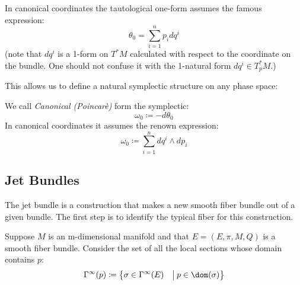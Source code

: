 \documentclass[Main]{subfiles}
\begin{document}
						In canonical coordinates the tautological one-form assumes the famous expression:
						\begin{displaymath}
							\theta_0 = \sum_{i=1}^n {p_i} d q^i
						\end{displaymath}
						(note that $d q^i$ is a 1-form on $T^*M$ calculated with respect to the coordinate on the bundle. One should not confuse it with the 1-natural form $d q^i \in T^*_p M$.)

	
					This allows us to define a natural symplectic structure on any phase space:
					\begin{definition}\label{Def:NatSymForm}
						We call \emph{Canonical (Poincarè)} form the symplectic:
						\begin{displaymath}
							\omega_0 \coloneqq -d \theta_0
						\end{displaymath}
						In canonical coordinates it assumes the renown expression:
						\begin{displaymath}
							\omega_0 \coloneqq \sum_{i=1}^n  d q^i \wedge d p_i
						\end{displaymath}
					\end{definition}
					
		\subsection{Jet Bundles}\label{Sect:JetBundles}
			The jet bundle is a %
			construction that makes a new smooth fiber bundle out of a given bundle. The first step is to identify the typical fiber for this construction.

			Suppose $M$ is an m-dimensional manifold and that $E =(E,\pi,M,Q)$ is a smooth fiber bundle. 
			Consider the set of all the local sections whose domain contains $p$:
			\begin{displaymath}
				\Gamma^\infty (p) \coloneqq \big\{ \sigma \in \Gamma^\infty(E) \quad \big\vert\:  p \in \dom(\sigma)  \big\}
			\end{displaymath}
\end{document}
